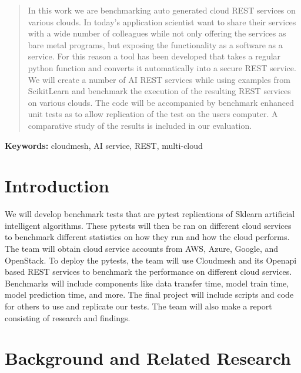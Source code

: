 
\tableofcontents

\newcommand{\TODO}[1]{\todo[inline]{#1}}

\begin{abstract}

In this work we are benchmarking auto generated cloud REST services on
various clouds. In today's application scientist want to share their
services with a wide number of colleagues while not only offering the
services as bare metal programs, but exposing the functionality as a
software as a service. For this reason a tool has been developed that
takes a regular python function and converts it automatically into a
secure REST service. We will create a number of AI REST services while
using examples from ScikitLearn and benchmark the execution of the
resulting REST services on various clouds. The code will be accompanied
by benchmark enhanced unit tests as to allow replication of the test on
the users computer. A comparative study of the results is included in
our evaluation.

\end{abstract}

\maketitle

\textbf{Keywords:} cloudmesh, AI service, REST, multi-cloud

\section{Introduction}\label{introduction}

We will develop benchmark tests that are pytest replications of Sklearn
artificial intelligent algorithms. These pytests will then be ran on
different cloud services to benchmark different statistics on how they
run and how the cloud performs. The team will obtain cloud service
accounts from AWS, Azure, Google, and OpenStack. To deploy the pytests,
the team will use Cloudmesh and its Openapi based REST services to
benchmark the performance on different cloud services. Benchmarks will
include components like data transfer time, model train time, model
prediction time, and more. The final project will include scripts and
code for others to use and replicate our tests. The team will also make
a report consisting of research and findings.

\section{Background and Related
Research}\label{background-and-related-research}


